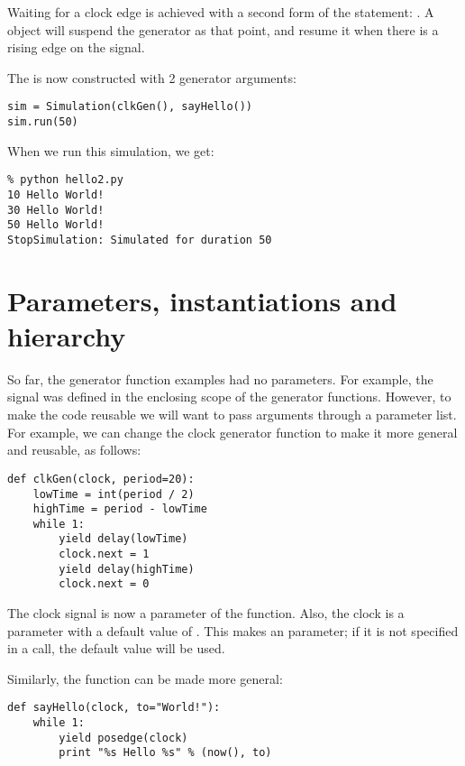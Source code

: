 Waiting for a clock edge is achieved with a second form of the
 statement: . 
A  object will suspend the generator as that point,
and resume it when there is a rising edge on the signal.

The  is now constructed with 2 generator arguments:

\begin{verbatim}
sim = Simulation(clkGen(), sayHello())
sim.run(50)

\end{verbatim}

When we run this simulation, we get:

\begin{verbatim}
% python hello2.py
10 Hello World!
30 Hello World!
50 Hello World!
StopSimulation: Simulated for duration 50

\end{verbatim}


\section{Parameters, instantiations and hierarchy}

So far, the generator function examples had no parameters. For
example, the  signal was defined in the enclosing scope of
the generator functions. However, to make the code reusable we will
want to pass arguments through a parameter list. For example, we can
change the clock generator function to make it more general
and reusable, as follows:

\begin{verbatim}
def clkGen(clock, period=20):
    lowTime = int(period / 2)
    highTime = period - lowTime
    while 1:
        yield delay(lowTime)
        clock.next = 1
        yield delay(highTime)
        clock.next = 0

\end{verbatim}

The clock signal is now a parameter of the function. Also, the clock
 is a parameter with a default value of .
This makes  an  parameter; if it is not
specified in a call, the default value will be used.

Similarly, the  function can be made more general:

\begin{verbatim}
def sayHello(clock, to="World!"):
    while 1:
        yield posedge(clock)
        print "%s Hello %s" % (now(), to)

\end{verbatim}

